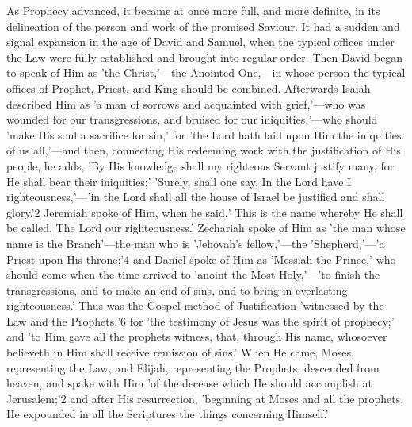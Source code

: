 \documentclass[
]{book}
\begin{document}
As Prophecy advanced, it became at once more full, and more definite, in its delineation of the person and work of the promised Saviour. It had a sudden and signal expansion in the age of David and Samuel, when the typical offices under the Law were fully established and brought into regular order. Then David began to speak of Him as 'the Christ,'---the Anointed One,---in whose person the typical offices of Prophet, Priest, and King should be combined. Afterwards Isaiah described Him as 'a man of sorrows and acquainted with grief,'---who was wounded for our transgressions, and bruised for our iniquities,'---who should 'make His soul a sacrifice for sin,' for 'the Lord hath laid upon Him the iniquities of us all,'---and then, connecting His redeeming work with the justification of His people, he adds, 'By His knowledge shall my righteous Servant justify many, for He shall bear their iniquities;' 'Surely, shall one say, In the Lord have I righteousness,'---'in the Lord shall all the house of Israel be justified and shall glory.'2 Jeremiah spoke of Him, when he said,' This is the name whereby He shall be called, The Lord our righteousness.' Zechariah spoke of Him as 'the man whose name is the Branch'---the man who is 'Jehovah's fellow,'---the 'Shepherd,'---'a Priest upon His throne;'4 and Daniel spoke of Him as 'Messiah the Prince,' who should come when the time arrived to 'anoint the Most Holy,'---'to finish the transgressions, and to make an end of sins, and to bring in everlasting righteousness.' Thus was the Gospel method of Justification 'witnessed by the Law and the Prophets,'6 for 'the testimony of Jesus was the spirit of prophecy;' and 'to Him gave all the prophets witness, that, through His name, whosoever believeth in Him shall receive remission of sins.' When He came, Moses, representing the Law, and Elijah, representing the Prophets, descended from heaven, and spake with Him 'of the decease which He should accomplish at Jerusalem;'2 and after His resurrection, 'beginning at Moses and all the prophets, He expounded in all the Scriptures the things concerning Himself.'
\end{document}
